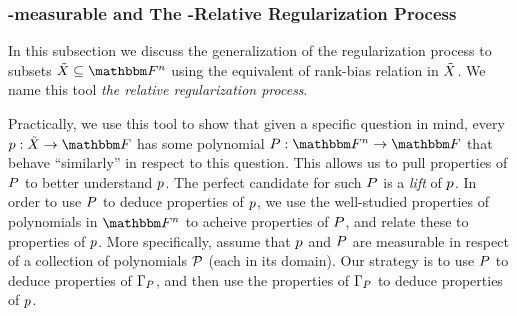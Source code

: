 
\subsubsection{\titlevariety-measurable and The \titlevariety-Relative Regularization Process}
In this subsection we discuss the generalization of the regularization process to subsets $\variety \subseteq \field$ using the equivalent of rank-bias relation in ${\tilde{X}}$.
We name this tool \emph{the relative regularization process}.

Practically, we use this tool to show that given a specific question in mind, every $\funcdef{\onvarpoly}{\variety}{\basefield}$ has some polynomial $\funcdef{\genpoly}{\field}{\basefield}$ that behave ``similarly'' in respect to this question.
This allows us to pull properties of $\genpoly$ to better understand $\onvarpoly$.
The perfect candidate for such $\genpoly$ is a \emph{lift} of $\onvarpoly$.
\newline
In order to use $\genpoly$ to deduce properties of $\onvarpoly$, we use the well-studied properties of polynomials in $\field$ to acheive properties of $\genpoly$, and relate these to properties of $\onvarpoly$.
More specifically, assume that $\onvarpoly$ and $\genpoly$ are measurable in respect of a collection of polynomials $\genpolyset$ (each in its domain).
Our strategy is to use $\genpoly$ to deduce properties of $\Gamma_{\genpoly}$, and then use the properties of $\Gamma_{\genpoly}$ to deduce properties of $\onvarpoly$.

